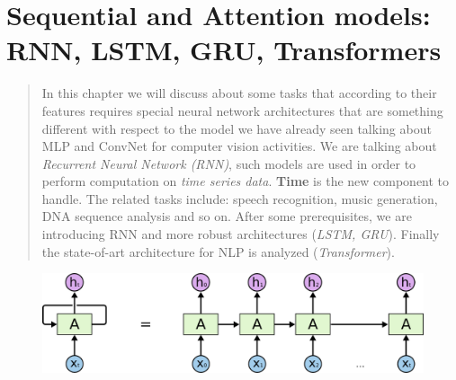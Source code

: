\chapter[Sequential models: RNN, LSTM, GRU, Transformers]{Sequential and Attention models: RNN, LSTM, GRU, Transformers}

\begin{quotation}
    \noindent
    \textsf{In this chapter we will discuss about some tasks that according to their features requires special neural network architectures that are something different with respect to the model we have already seen talking about MLP and ConvNet for computer vision activities. We are talking about \textit{Recurrent Neural Network (RNN)}, such models are used in order to perform computation on  \textit{time series data}. \textbf{Time} is the new component to handle. The related tasks include: speech recognition, music generation, DNA sequence analysis and so on. After some prerequisites, we are introducing RNN and more robust architectures (\textit{LSTM, GRU}). Finally the state-of-art architecture for NLP is analyzed (\textit{Transformer}).  
    }
\end{quotation}

\begin{figure}[h]
    \centering
    \includegraphics[scale=0.3]{img/rnn_1.png}
\end{figure}


